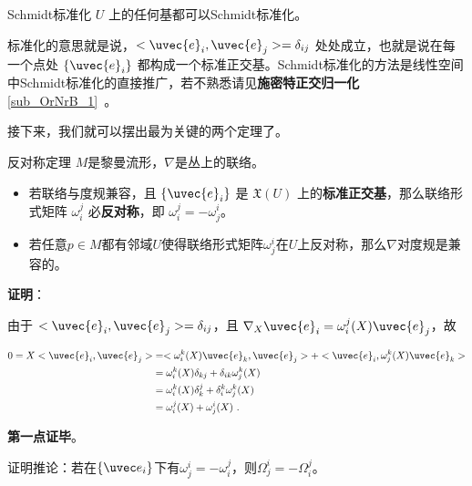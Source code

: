 \begin{theorem}{Schmidt标准化}
$U$ 上的任何基都可以Schmidt标准化。
\end{theorem}

标准化的意思就是说，$<\uvec{e}_i, \uvec{e}_j>=\delta_{ij}$ 处处成立，也就是说在每一个点处 $\{\uvec{e}_i\}$ 都构成一个标准正交基。Schmidt标准化的方法是线性空间中Schmidt标准化的直接推广，若不熟悉请见\textbf{施密特正交归一化}\autoref{sub_OrNrB_1}~。

接下来，我们就可以摆出最为关键的两个定理了。

\begin{theorem}{反对称定理}\label{the_ConFom_1}
$M$是黎曼流形，$\nabla$是丛上的联络。
\begin{itemize}
\item 若联络与度规兼容，且 $\{\uvec{e}_i\}$ 是 $\mathfrak{X}(U)$ 上的\textbf{标准正交基}，那么联络形式矩阵 $\omega^j_i$ 必\textbf{反对称}，即 $\omega^j_i=-\omega^i_j$。
\item 若任意$p\in M$都有邻域$U$使得联络形式矩阵$\omega^i_j$在$U$上反对称，那么$\nabla$对度规是兼容的。
\end{itemize}
\end{theorem}

\textbf{证明}：

由于 $<\uvec{e}_i, \uvec{e}_j>=\delta_{ij}$，且 $\nabla_X\uvec{e}_i=\omega^j_i(X)\uvec{e}_j$，故

\begin{equation}
\begin{aligned}
0=X<\uvec{e}_i, \uvec{e}_j>&=<\omega^k_i(X)\uvec{e}_k, \uvec{e}_j>+<\uvec{e}_i, \omega^k_j(X)\uvec{e}_k>\\
&=\omega^k_i(X)\delta_{kj}+\delta_{ik}\omega^k_j(X)\\
&=\omega^k_i(X)\delta_{k}^j+\delta_{i}^k\omega^k_j(X)\\
&=\omega^j_i(X)+\omega^i_j(X)~.
\end{aligned}
\end{equation}

\textbf{第一点证毕}。
\begin{exercise}{}
证明推论：若在$\{\uvec e_i\}$下有$\omega^i_j=-\omega^j_i$，则$\Omega^i_j=-\Omega^j_i$。
\end{exercise}


